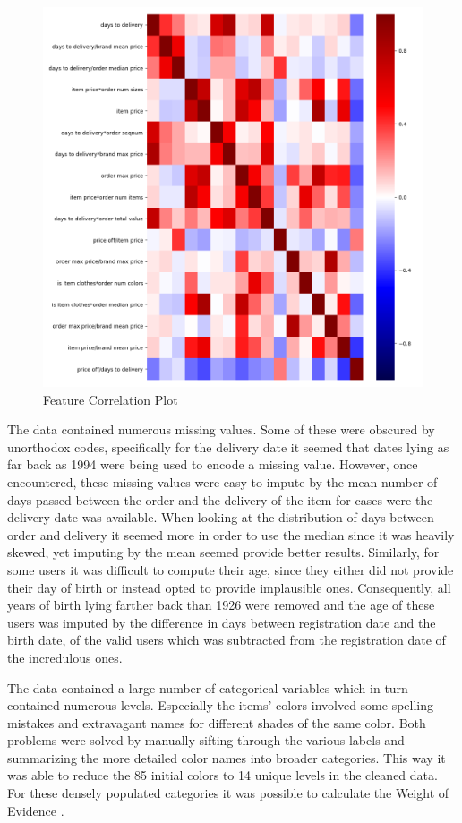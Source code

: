 \begin{figure}
\caption{Feature Correlation Plot}
\includegraphics[scale=0.28]{../eda/corrplot.png}
\end{figure}

The data contained numerous missing values. Some of these were obscured by unorthodox codes, specifically for the delivery date it seemed that dates lying as far back as 1994 were being used to encode a missing value. However, once encountered, these missing values were easy to impute by the mean number of days passed between the order and the delivery of the item for cases were the delivery date was available. When looking at the distribution of days between order and delivery it seemed more in order to use the median since it was heavily skewed, yet imputing by the mean seemed provide better results. Similarly, for some users it was difficult to compute their age, since they either did not provide their day of birth or instead opted to provide implausible ones. Consequently, all years of birth lying farther back than 1926 were removed and the age of these users was imputed by the difference in days between registration date and the birth date, of the valid users which was subtracted from the registration date of the incredulous ones.

The data contained a large number of categorical variables which in turn contained numerous levels. Especially the items' colors involved some spelling mistakes and extravagant names for different shades of the same color. Both problems were solved by manually sifting through the various labels and summarizing the more detailed color names into broader categories. This way it was able to reduce the 85 initial colors to 14 unique levels in the cleaned data. For these densely populated categories it was possible to calculate the Weight of Evidence \cite{woe}.

